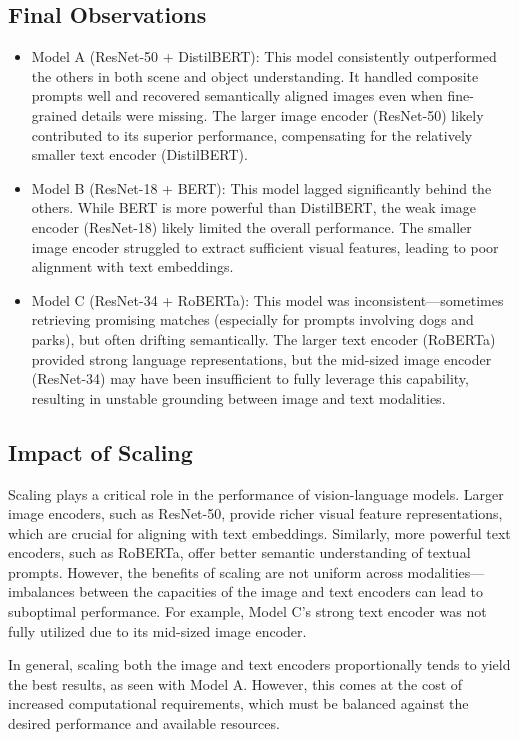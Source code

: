 \documentclass[11pt]{article}
\begin{document}
\subsection{Final Observations}
\begin{itemize}
    \item{Model A (ResNet-50 + DistilBERT):} This model consistently outperformed the others in both scene and object understanding. It handled composite prompts well and recovered semantically aligned images even when fine-grained details were missing. The larger image encoder (ResNet-50) likely contributed to its superior performance, compensating for the relatively smaller text encoder (DistilBERT).
    \item{Model B (ResNet-18 + BERT):} This model lagged significantly behind the others. While BERT is more powerful than DistilBERT, the weak image encoder (ResNet-18) likely limited the overall performance. The smaller image encoder struggled to extract sufficient visual features, leading to poor alignment with text embeddings.
    \item{Model C (ResNet-34 + RoBERTa):} This model was inconsistent—sometimes retrieving promising matches (especially for prompts involving dogs and parks), but often drifting semantically. The larger text encoder (RoBERTa) provided strong language representations, but the mid-sized image encoder (ResNet-34) may have been insufficient to fully leverage this capability, resulting in unstable grounding between image and text modalities.
\end{itemize}

\subsection{Impact of Scaling}

Scaling plays a critical role in the performance of vision-language models. Larger image encoders, such as ResNet-50, provide richer visual feature representations, which are crucial for aligning with text embeddings. Similarly, more powerful text encoders, such as RoBERTa, offer better semantic understanding of textual prompts. However, the benefits of scaling are not uniform across modalities—imbalances between the capacities of the image and text encoders can lead to suboptimal performance. For example, Model C's strong text encoder was not fully utilized due to its mid-sized image encoder.

In general, scaling both the image and text encoders proportionally tends to yield the best results, as seen with Model A. However, this comes at the cost of increased computational requirements, which must be balanced against the desired performance and available resources.
\end{document}
